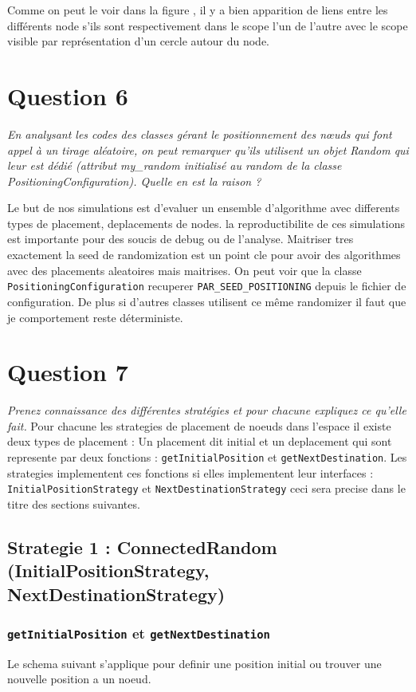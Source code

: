 \documentclass[11pt,a4paper,sans]{report}
\begin{document}
	\par Comme on peut le voir dans la figure %
	, il y a bien apparition de liens
	entre les différents node s'ils sont respectivement dans le scope l'un de l'autre avec le scope visible par représentation d'un cercle autour du node.

	\newpage
	\section{Question 6}
	\textit{En analysant les codes des classes gérant le positionnement des nœuds qui font appel à un tirage aléatoire, on peut remarquer qu’ils utilisent un objet Random qui leur est dédié (attribut my\_random initialisé au random de la classe PositioningConfiguration).  Quelle en est la raison ?}

	Le but de nos simulations est d'evaluer un ensemble d'algorithme avec differents types de placement, deplacements de nodes. la reproductibilite de ces simulations est importante pour des soucis de debug ou de l'analyse. Maitriser tres exactement la seed de randomization est un point cle pour avoir des algorithmes avec des placements aleatoires mais maitrises. On peut voir que la classe \texttt{PositioningConfiguration} recuperer \texttt{PAR\_SEED\_POSITIONING} depuis le fichier de configuration. De plus si d'autres classes utilisent ce même randomizer il faut que je comportement reste déterministe.


	\section{Question 7}
	\textit{Prenez connaissance des différentes stratégies et pour chacune expliquez ce qu’elle fait.}
	Pour chacune les strategies de placement de noeuds dans l'espace il existe deux types de placement : Un placement dit initial et un deplacement qui sont represente par deux fonctions :
	\texttt{getInitialPosition} et \texttt{getNextDestination}. Les strategies implementent ces fonctions si elles implementent leur interfaces : \texttt{InitialPositionStrategy} et \texttt{NextDestinationStrategy} ceci sera precise dans le titre des sections suivantes.

	\subsection*{Strategie 1 : ConnectedRandom (InitialPositionStrategy, NextDestinationStrategy)}
	\subsubsection{\texttt{getInitialPosition} et \texttt{getNextDestination}}
	\par Le schema suivant s'applique pour definir une position initial ou trouver une nouvelle position a un noeud.
\end{document}
